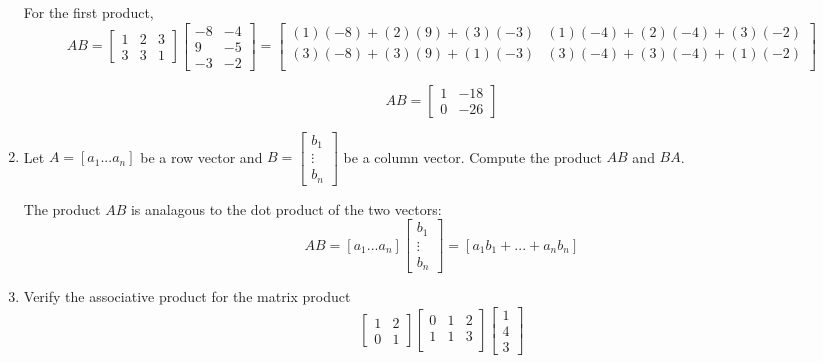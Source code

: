 \begin{enumerate}[label=1.\arabic*]
    \begin{mysolution}
        For the first product,
        \[
            AB = \begin{bmatrix}
                1 & 2 & 3 \\
                3 & 3 & 1
            \end{bmatrix}
            \begin{bmatrix}
                -8 & -4 \\
                9 & -5 \\
                -3 & -2
            \end{bmatrix}
             = \begin{bmatrix}
                (1)(-8)+(2)(9)+(3)(-3) & (1)(-4)+(2)(-4)+(3)(-2) \\ 
                (3)(-8)+(3)(9)+(1)(-3) & (3)(-4)+(3)(-4)+(1)(-2) \\ 
             \end{bmatrix}
        \]

        \[
            AB = \begin{bmatrix}
                1 & -18 \\
                0 & -26
            \end{bmatrix}
        \]
    \end{mysolution}

    \item Let $A = [a_1 ... a_n]$ be a row vector and $B = 
    \begin{bmatrix}
        b_1 \\ 
        \vdots \\
        b_n
    \end{bmatrix}$ be a column vector. Compute the product $AB$ and $BA$.
    \begin{mysolution}
        The product $AB$ is analagous to the dot product of the two vectors:
        \[
            AB = [a_1 ... a_n]
            \begin{bmatrix}
                b_1 \\ 
                \vdots \\
                b_n
            \end{bmatrix} = [a_1b_1+...+a_n b_n]
        \]
    \end{mysolution}
    \item Verify the associative product for the matrix product
    \[
      \begin{bmatrix}
        1 & 2 \\
        0 & 1
      \end{bmatrix}
      \begin{bmatrix}
        0 & 1 & 2 \\
        1 & 1 & 3 \\
      \end{bmatrix}
      \begin{bmatrix}
        1 \\ 4 \\ 3
      \end{bmatrix}
    \]


\end{enumerate}
